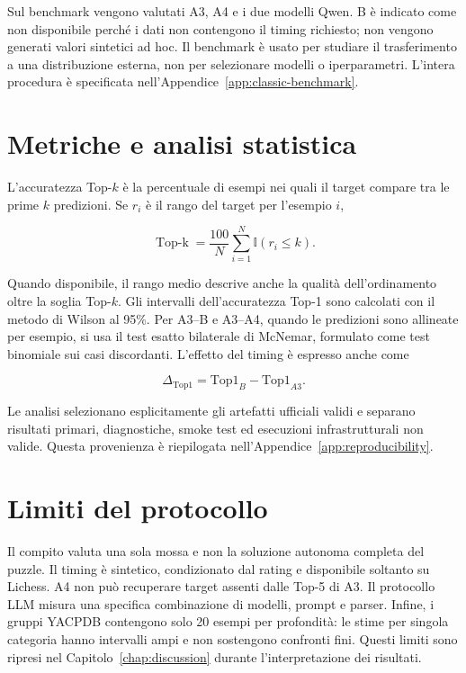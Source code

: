Sul benchmark vengono valutati A3, A4 e i due modelli Qwen. B è indicato come non
disponibile perché i dati non contengono il timing richiesto; non vengono generati
valori sintetici ad hoc. Il benchmark è usato per studiare il trasferimento a una
distribuzione esterna, non per selezionare modelli o iperparametri. L'intera
procedura è specificata nell'Appendice~\ref{app:classic-benchmark}.

\section{Metriche e analisi statistica}

L'accuratezza Top-\(k\) è la percentuale di esempi nei quali il target compare tra
le prime \(k\) predizioni. Se \(r_i\) è il rango del target per l'esempio \(i\),

\begin{equation}
    \operatorname{Top\text{-}k}
    = \frac{100}{N}\sum_{i=1}^{N}\mathbb{I}(r_i\leq k).
    \label{eq:topk-accuracy}
\end{equation}

Quando disponibile, il rango medio descrive anche la qualità dell'ordinamento oltre
la soglia Top-\(k\). Gli intervalli dell'accuratezza Top-1 sono calcolati con il
metodo di Wilson al 95\%. Per A3--B e A3--A4, quando le predizioni sono allineate
per esempio, si usa il test esatto bilaterale di McNemar, formulato come test
binomiale sui casi discordanti. L'effetto del timing è espresso anche come

\begin{equation}
    \Delta_{\mathrm{Top1}}=\mathrm{Top1}_{B}-\mathrm{Top1}_{A3}.
    \label{eq:top1-difference}
\end{equation}

Le analisi selezionano esplicitamente gli artefatti ufficiali validi e separano
risultati primari, diagnostiche, smoke test ed esecuzioni infrastrutturali non
valide. Questa provenienza è riepilogata nell'Appendice~\ref{app:reproducibility}.

\section{Limiti del protocollo}

Il compito valuta una sola mossa e non la soluzione autonoma completa del puzzle.
Il timing è sintetico, condizionato dal rating e disponibile soltanto su Lichess.
A4 non può recuperare target assenti dalle Top-5 di A3. Il protocollo LLM misura
una specifica combinazione di modelli, prompt e parser. Infine, i gruppi YACPDB
contengono solo 20 esempi per profondità: le stime per singola categoria hanno
intervalli ampi e non sostengono confronti fini. Questi limiti sono ripresi nel
Capitolo~\ref{chap:discussion} durante l'interpretazione dei risultati.
